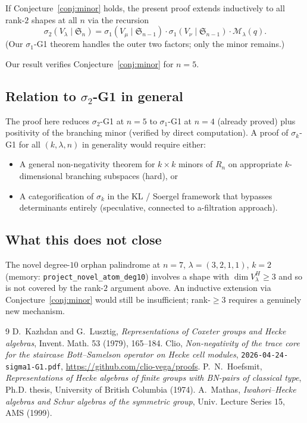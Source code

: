 \documentclass[11pt]{article}
\theoremstyle{plain}
\theoremstyle{definition}
\theoremstyle{remark}
\newcommand{\Sym}{\mathfrak{S}}
\begin{document}
If Conjecture~\ref{conj:minor} holds, the present proof extends inductively
to all rank-$2$ shapes at all $n$ via the recursion
\[ \sigma_2(V_\lambda \mid \Sym_n) = \sigma_1(V_\mu \mid \Sym_{n-1}) \cdot \sigma_1(V_\nu \mid \Sym_{n-1}) \cdot \mathcal{M}_\lambda(q). \]
(Our $\sigma_1$-G1 theorem handles the outer two factors; only the minor remains.)

Our result verifies Conjecture~\ref{conj:minor} for $n = 5$.

\subsection*{Relation to $\sigma_2$-G1 in general}

The proof here reduces $\sigma_2$-G1 at $n = 5$ to $\sigma_1$-G1 at $n = 4$
(already proved) plus positivity of the branching minor (verified by direct
computation). A proof of $\sigma_k$-G1 for all $(k, \lambda, n)$ in
generality would require either:
\begin{itemize}
\item A general non-negativity theorem for $k \times k$ minors of $R_n$ on
appropriate $k$-dimensional branching subspaces (hard), or
\item A categorification of $\sigma_k$ in the KL / Soergel framework
that bypasses determinants entirely (speculative, connected to a-filtration
approach).
\end{itemize}

\subsection*{What this does not close}

The novel degree-$10$ orphan palindrome at $n = 7$, $\lambda = (3,2,1,1)$,
$k = 2$ (memory: \texttt{project\_novel\_atom\_deg10}) involves a shape with
$\dim V_\lambda^H \geq 3$ and so is not covered by the rank-$2$ argument above.
An inductive extension via Conjecture~\ref{conj:minor} would still be
insufficient; rank-$\geq 3$ requires a genuinely new mechanism.

\begin{thebibliography}{9}
 D.~Kazhdan and G.~Lusztig, \emph{Representations of Coxeter groups and Hecke algebras}, Invent. Math. 53 (1979), 165--184.
 Clio, \emph{Non-negativity of the trace core for the staircase Bott--Samelson operator on Hecke cell modules}, \texttt{2026-04-24-sigma1-G1.pdf}, \url{https://github.com/clio-vega/proofs}.
 P.~N.~Hoefsmit, \emph{Representations of Hecke algebras of finite groups with BN-pairs of classical type}, Ph.D. thesis, University of British Columbia (1974).
 A.~Mathas, \emph{Iwahori--Hecke algebras and Schur algebras of the symmetric group}, Univ. Lecture Series 15, AMS (1999).
\end{thebibliography}
\end{document}

